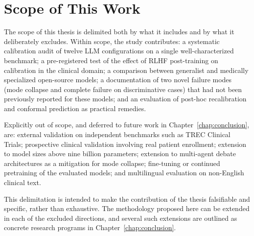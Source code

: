\section{Scope of This Work}
\label{sec:ctx-scope}

The scope of this thesis is delimited both by what it includes and by 
what it deliberately excludes. Within scope, the study contributes: a 
systematic calibration audit of twelve LLM configurations on a 
single well-characterized benchmark; a pre-registered test of the 
effect of RLHF post-training on calibration in the clinical domain; 
a comparison between generalist and medically specialized open-source 
models; a documentation of two novel failure modes (mode collapse 
and complete failure on discriminative cases) that had not been 
previously reported for these models; and an evaluation of post-hoc 
recalibration and conformal prediction as practical remedies.

Explicitly out of scope, and deferred to future work in 
Chapter~\ref{chap:conclusion}, are: external validation on independent 
benchmarks such as TREC Clinical Trials; prospective clinical 
validation involving real patient enrollment; extension to model sizes 
above nine billion parameters; extension to multi-agent debate 
architectures as a mitigation for mode collapse; fine-tuning or 
continued pretraining of the evaluated models; and multilingual 
evaluation on non-English clinical text.

This delimitation is intended to make the contribution of the thesis 
falsifiable and specific, rather than exhaustive. The methodology 
proposed here can be extended in each of the excluded directions, and 
several such extensions are outlined as concrete research programs in 
Chapter~\ref{chap:conclusion}.